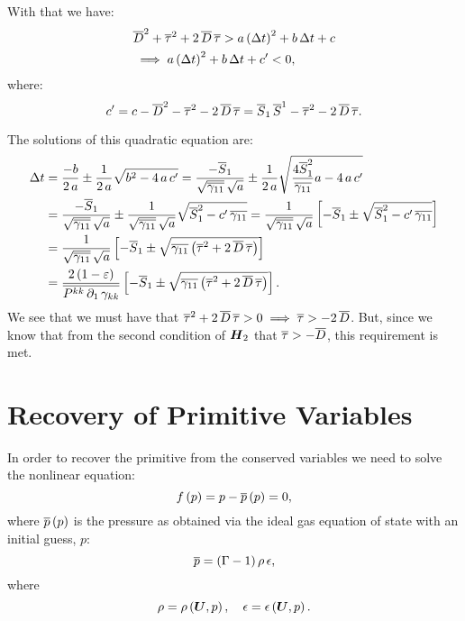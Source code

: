 \documentclass[10pt,preprint]{aastex}
\begin{document}
With that we have:
\begin{align}
    &\overline{D}^{2}+\overline{\tau}^{2}+2\,\overline{D}\,\overline{\tau}>a\left(\Delta t\right)^{2}+b\,\Delta t+c\\
    &\implies a\left(\Delta t\right)^{2}+b\,\Delta t+c'<0,
\end{align}
where:
\begin{equation}
  c'=c-\overline{D}^{2}-\overline{\tau}^{2}-2\,\overline{D}\,\overline{\tau}=\overline{S}_{1}\,\overline{S}^{1}-\overline{\tau}^{2}-2\,\overline{D}\,\overline{\tau}.
\end{equation}

The solutions of this quadratic equation are:
\begin{align}
    \Delta t&=\frac{-b}{2\,a}\pm\frac{1}{2\,a}\sqrt{b^{2}-4\,a\,c'}=\frac{-\overline{S}_{1}}{\sqrt{\overline{\gamma_{11}}}\,\sqrt{a}}\pm\frac{1}{2\,a}\sqrt{\frac{4\overline{S}_{1}^{2}}{\overline{\gamma_{11}}}a-4\,a\,c'}\\
    &=\frac{-\overline{S}_{1}}{\sqrt{\overline{\gamma_{11}}}\,\sqrt{a}}\pm\frac{1}{\sqrt{\overline{\gamma_{11}}}\,\sqrt{a}}\sqrt{\overline{S}_{1}^{2}-c'\,\overline{\gamma_{11}}}=\frac{1}{\sqrt{\overline{\gamma_{11}}}\,\sqrt{a}}\left[-\overline{S}_{1}\pm\sqrt{\overline{S}_{1}^{2}-c'\,\overline{\gamma_{11}}}\right]\\
    &=\frac{1}{\sqrt{\overline{\gamma_{11}}}\,\sqrt{a}}\left[-\overline{S}_{1}\pm\sqrt{\overline{\gamma_{11}}\left(\overline{\tau}^{2}+2\,\overline{D}\,\overline{\tau}\right)}\right]\\
    &=\frac{2\left(1-\varepsilon\right)}{\overline{P^{kk}\,\partial_{1}\,\gamma_{kk}}}\left[-\overline{S}_{1}\pm\sqrt{\overline{\gamma_{11}}\left(\overline{\tau}^{2}+2\,\overline{D}\,\overline{\tau}\right)}\right].
\end{align}
We see that we must have that $\overline{\tau}^{2}+2\,\overline{D}\,\overline{\tau}>0\implies\overline{\tau}>-2\,\overline{D}$. But, since we know that from the second condition of $\boldsymbol{H}_{2}$ that $\overline{\tau}>-\overline{D}$, this requirement is met.

\newpage
\section{Recovery of Primitive Variables}
In order to recover the primitive from the conserved variables we need to solve the nonlinear equation:
\begin{equation}
    f\left(p\right)=p-\overline{p}\left(p\right)=0,
\end{equation}
where $\overline{p}\left(p\right)$ is the pressure as obtained via the ideal gas equation of state with an initial guess, $p$:
\begin{equation}
    \overline{p}=\left(\Gamma-1\right)\rho\,\epsilon,
\end{equation}
where
\begin{equation}
    \rho=\rho\left(\boldsymbol{U},p\right),\hspace{1em}\epsilon=\epsilon\left(\boldsymbol{U},p\right).
\end{equation}
\end{document}
